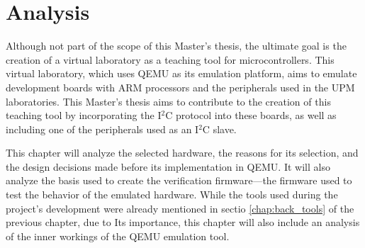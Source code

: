 \chapter{Analysis}
\label{chap:analysis}

Although not part of the scope of this Master's thesis, the ultimate goal is the 
creation of a virtual laboratory as a teaching tool for microcontrollers. This virtual 
laboratory, which uses QEMU as its emulation platform, aims to emulate development boards 
with ARM processors and the peripherals used in the UPM laboratories. 
This Master's thesis aims to contribute to the creation of this teaching tool 
by incorporating the I$^2$C protocol into these boards, as well as including one of the 
peripherals used as an I$^2$C slave.

This chapter will analyze the selected hardware, the reasons for its selection, and 
the design decisions made before its implementation in QEMU. It will also analyze 
the basis used to create the verification firmware—the firmware used to test the 
behavior of the emulated hardware. While the tools used during the project's 
development were already mentioned in sectio \ref{chap:back_tools} of the previous chapter, due to 
Its importance, this chapter will also include an analysis of the inner workings of 
the QEMU emulation tool.





